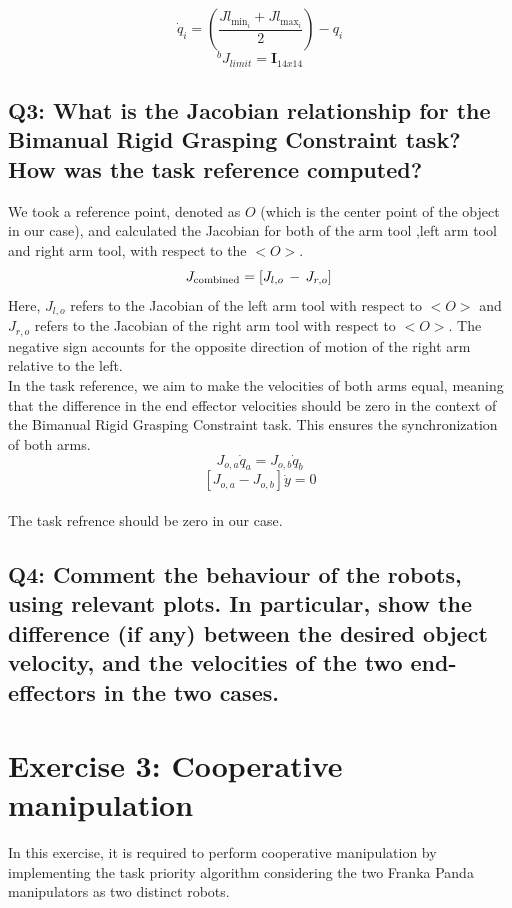 \documentclass{article}
\begin{document}
\[
\dot{q}_i = \left(\frac{Jl_{\text{min}_i} + Jl_{\text{max}_i}}{2}\right) - q_i
\]
$${}^{b}J_{limit} =  \mathbf{I}_{14x14}$$

\subsection{Q3: What is the Jacobian relationship for the Bimanual Rigid Grasping Constraint task? How was the task reference computed?}

We took a reference point, denoted as  \( \mathit{O} \) (which is the center point of the object in our case), and calculated the Jacobian for both of the arm tool ,left arm tool and right arm tool, with respect to the  \( \mathit{<O>} \). \\
\[
J_{\text{combined}} = \left[ J_{l,o} \, - \, J_{r,o} \right]\\
\]
\noindent
Here, $J_{l,o}$ refers to the Jacobian of the left arm tool with respect to \( \mathit{<O>} \) and  $J_{r,o}$ refers to the Jacobian of the right arm tool with respect to \( \mathit{<O>} \). The negative sign accounts for the opposite direction of motion of the right arm relative to the left.\\
In the task reference, we aim to make the velocities of both arms equal, meaning that the difference in the end effector velocities should be zero in the context of the Bimanual Rigid Grasping Constraint task. This ensures the synchronization of both arms.\\
 
\[
{J}_{o,a} \dot{q}_a = {J}_{o,b} \dot{q}_b
\]
\[
[{J}_{o,a} - {J}_{o,b}]\dot{y}  = 0
\]\\
The task refrence should be zero in our case.
\subsection{Q4: Comment the behaviour of the robots, using relevant plots. In particular, show the difference (if any) between the desired object velocity, and the velocities of the two end-effectors in the two cases.}

\clearpage

\section{Exercise 3: Cooperative manipulation}
In this exercise, it is required to perform cooperative manipulation by implementing the task priority algorithm considering the two Franka Panda manipulators as two distinct robots. 
\end{document}
